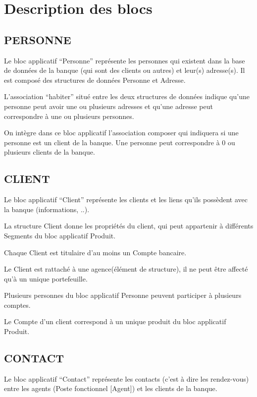 \section{Description des blocs}
       \subsection{PERSONNE}

Le bloc applicatif  “Personne” représente les personnes qui existent dans la base de données de la banque (qui sont des clients ou autres) et leur(s) adresse(s). Il est composé des structures de données Personne et Adresse.

L’association “habiter” situé entre les deux structures de données indique qu’une personne peut avoir une ou plusieurs adresses et qu’une adresse peut correspondre à une ou plusieurs personnes.

On intègre dans ce bloc applicatif l’association composer qui indiquera si une personne est un client de la banque. Une personne peut correspondre à 0 ou plusieurs clients de la banque.

       \subsection{CLIENT}

Le bloc applicatif “Client” représente les clients et les liens qu'ils possèdent avec la banque (informations, ..).

La structure Client donne les propriétés du client, qui peut appartenir à différents Segments du bloc applicatif Produit.

Chaque Client est titulaire d'au moins un Compte bancaire.

Le Client est rattaché à une agence(élément de structure), il ne peut être affecté qu'à un unique portefeuille.

Plusieurs personnes du bloc applicatif Personne peuvent participer à plusieurs comptes.

Le Compte d'un client correspond à un unique produit du bloc applicatif Produit.

       \subsection{CONTACT}

Le bloc applicatif “Contact” représente les contacts (c'est à dire les rendez-vous) entre les agents (Poste fonctionnel [Agent]) et les clients de la banque.

